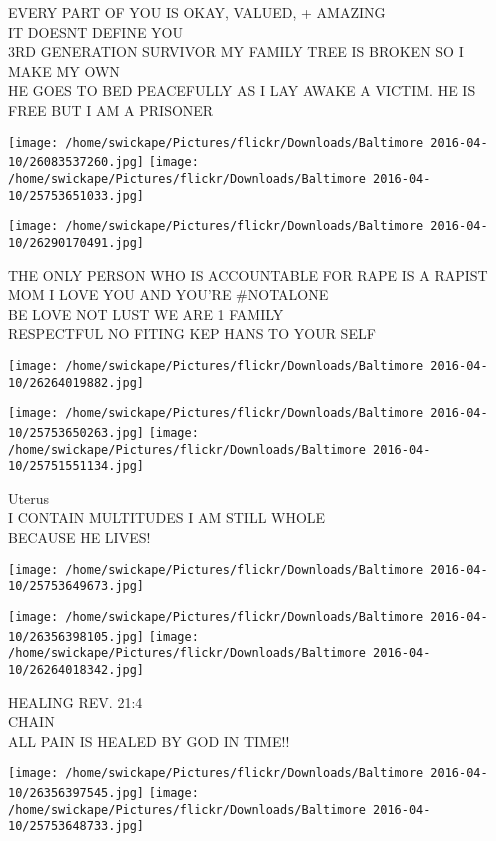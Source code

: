 \documentclass[10pt,letterpaper]{article}
\begin{document}
EVERY PART OF YOU IS OKAY, VALUED, + AMAZING\\
IT DOESNT DEFINE YOU\\
3RD GENERATION SURVIVOR MY FAMILY TREE IS BROKEN SO I MAKE MY OWN\\
HE GOES TO BED PEACEFULLY AS I LAY AWAKE A VICTIM.  HE IS FREE BUT I AM A PRISONER
\pagebreak

\texttt{[image: /home/swickape/Pictures/flickr/Downloads/Baltimore 2016-04-10/26083537260.jpg]}
\texttt{[image: /home/swickape/Pictures/flickr/Downloads/Baltimore 2016-04-10/25753651033.jpg]}

\texttt{[image: /home/swickape/Pictures/flickr/Downloads/Baltimore 2016-04-10/26290170491.jpg]}

THE ONLY PERSON WHO IS ACCOUNTABLE FOR RAPE IS A RAPIST MOM I LOVE YOU AND YOU'RE \#NOTALONE\\
BE LOVE NOT LUST WE ARE 1 FAMILY\\
RESPECTFUL NO FITING KEP HANS TO YOUR SELF
\pagebreak

\texttt{[image: /home/swickape/Pictures/flickr/Downloads/Baltimore 2016-04-10/26264019882.jpg]}

\vspace{0.25in}
\texttt{[image: /home/swickape/Pictures/flickr/Downloads/Baltimore 2016-04-10/25753650263.jpg]}
\texttt{[image: /home/swickape/Pictures/flickr/Downloads/Baltimore 2016-04-10/25751551134.jpg]}

Uterus\\
I CONTAIN MULTITUDES I AM STILL WHOLE\\
BECAUSE HE LIVES!
\pagebreak

\texttt{[image: /home/swickape/Pictures/flickr/Downloads/Baltimore 2016-04-10/25753649673.jpg]}

\vspace{0.25in}
\texttt{[image: /home/swickape/Pictures/flickr/Downloads/Baltimore 2016-04-10/26356398105.jpg]}
\texttt{[image: /home/swickape/Pictures/flickr/Downloads/Baltimore 2016-04-10/26264018342.jpg]}

HEALING REV. 21:4\\
CHAIN\\
ALL PAIN IS HEALED BY GOD IN TIME!!
\pagebreak

\texttt{[image: /home/swickape/Pictures/flickr/Downloads/Baltimore 2016-04-10/26356397545.jpg]}
\texttt{[image: /home/swickape/Pictures/flickr/Downloads/Baltimore 2016-04-10/25753648733.jpg]}
\end{document}
